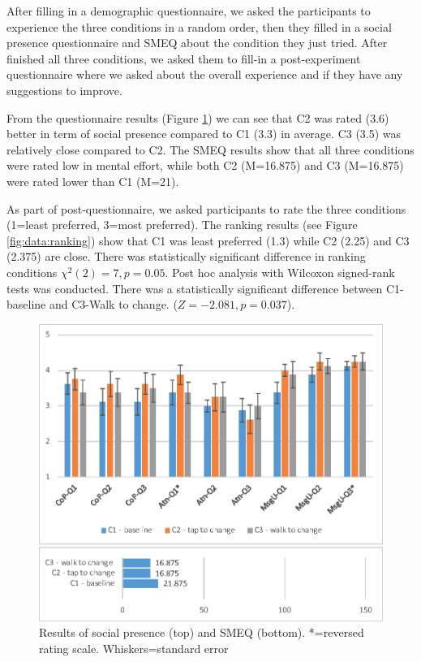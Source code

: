 After filling in a demographic questionnaire, we asked the participants to experience the three conditions in a random order, then they filled in a social presence questionnaire and SMEQ about the condition they just tried. After finished all three conditions, we asked them to fill-in a post-experiment questionnaire where we asked about the overall experience and if they have any suggestions to improve. 

From the questionnaire results (Figure \ref{fig:data:results}) we can see that C2 was rated (3.6) better in term of social presence compared to C1 (3.3) in average. C3 (3.5) was relatively close compared to C2. The SMEQ results show that all three conditions were rated low in mental effort, while both C2 (M=16.875) and C3 (M=16.875) were rated lower than C1 (M=21).

As part of post-questionnaire, we asked participants to rate the three conditions (1=least preferred, 3=most preferred). The ranking results (see Figure \ref{fig:data:ranking}) show that C1 was least preferred (1.3) while C2 (2.25) and C3 (2.375) are close. There was statistically significant difference in ranking conditions $\chi^2(2)=7, p=0.05$. Post hoc analysis with Wilcoxon signed-rank tests was conducted. There was a statistically significant difference between C1-baseline and C3-Walk to change. ($Z=-2.081, p=0.037$).



\begin{figure}
  \centering
  \includegraphics[width=\columnwidth]{images/chi/images-01.eps}
  \caption{Results of social presence (top) and SMEQ (bottom). *=reversed rating scale. Whiskers=standard error}
  \label{fig:data:results}
\end{figure}


